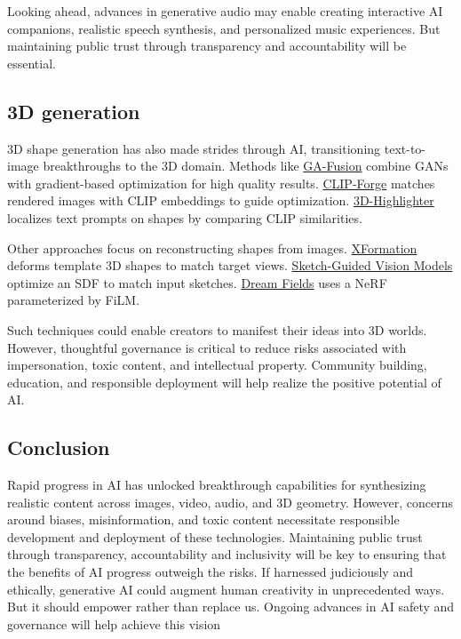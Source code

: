 Looking ahead, advances in generative audio may enable creating interactive AI companions, realistic speech synthesis, and personalized music experiences. But maintaining public trust through transparency and accountability will be essential.

\subsection{3D generation}

3D shape generation has also made strides through AI, transitioning text-to-image breakthroughs to the 3D domain. Methods like \href{https://nv-tlabs.github.io/GA-fusion}{GA-Fusion} combine GANs with gradient-based optimization for high quality results. \href{https://github.com/autodeskailab/clip-forge}{CLIP-Forge} matches rendered images with CLIP embeddings to guide optimization. \href{https://threedle.github.io/3dhighlighter}{3D-Highlighter} localizes text prompts on shapes by comparing CLIP similarities.

Other approaches focus on reconstructing shapes from images. \href{https://x-a-i.github.io/xformation}{XFormation} deforms template 3D shapes to match target views. \href{https://sketching-the-future.github.io}{Sketch-Guided Vision Models} optimize an SDF to match input sketches. \href{https://ajayj.com/dreamfields}{Dream Fields} uses a NeRF parameterized by FiLM.

Such techniques could enable creators to manifest their ideas into 3D worlds. However, thoughtful governance is critical to reduce risks associated with impersonation, toxic content, and intellectual property. Community building, education, and responsible deployment will help realize the positive potential of AI.

\subsection{Conclusion}

Rapid progress in AI has unlocked breakthrough capabilities for synthesizing realistic content across images, video, audio, and 3D geometry. However, concerns around biases, misinformation, and toxic content necessitate responsible development and deployment of these technologies. Maintaining public trust through transparency, accountability and inclusivity will be key to ensuring that the benefits of AI progress outweigh the risks. If harnessed judiciously and ethically, generative AI could augment human creativity in unprecedented ways. But it should empower rather than replace us. Ongoing advances in AI safety and governance will help achieve this vision


